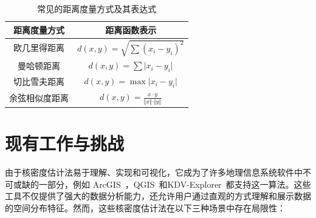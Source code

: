 \begin{table}[!h]
	\centering
	\def\arraystretch{1.5}
	\caption{常见的距离度量方式及其表达式}
	\label{tab2}
	\begin{tabular}{c|c}
		\hline
		距离度量方式       & 距离函数表示   \\ \hline \hline
		欧几里得距离 & $d(x, y) = \sqrt{\sum{(x_i - y_i)}^2}$ \\ 
		曼哈顿距离   & $d(x, y) = \sum \vert x_i - y_i \vert$ \\ 
		切比雪夫距离 & $d(x, y) = \max \vert x_i - y_i \vert$ \\ 
		余弦相似度距离	 & $d(x, y) = \frac{x \cdot y}{\Vert x \Vert \cdot \Vert y \Vert}$     \\ \hline
	\end{tabular}
\end{table}

\section{现有工作与挑战}

由于核密度估计法易于理解、实现和可视化，它成为了许多地理信息系统软件中不可或缺的一部分，例如 ArcGIS~\cite{noauthor_arcgis_nodate}，QGIS~\cite{noauthor_qgis_nodate}和KDV-Explorer~\cite{chan_kdv-explorer_2021}都支持这一算法。这些工具不仅提供了强大的数据分析能力，还允许用户通过直观的方式理解和展示数据的空间分布特征。然而，这些核密度估计法在以下三种场景中存在局限性：

